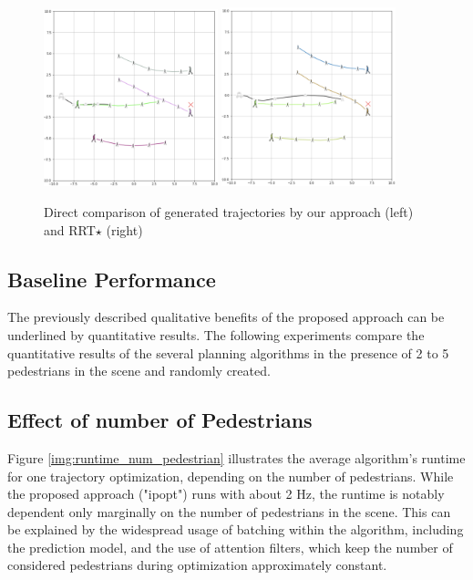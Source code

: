 {\begin{figure}[!ht]
\begin{center}
\includegraphics[width=0.45\textwidth]{images/show_case_ipopt.png}
\includegraphics[width=0.45\textwidth]{images/show_case_rrt.png}
\end{center}
\caption{Direct comparison of generated trajectories by our approach (left) and \ac{RRT}$\star$ \cite{Karaman2011} (right)}
\label{img:show_case}
\end{figure}

\subsection{Baseline Performance}
The previously described qualitative benefits of the proposed approach can be underlined by quantitative results. The following experiments compare the quantitative results of the several planning algorithms in the presence of 2 to 5 pedestrians in the scene and randomly created. 

\subsection{Effect of number of Pedestrians}
Figure \ref{img:runtime_num_pedestrian} illustrates the average algorithm's runtime for one trajectory optimization, depending on the number of pedestrians. While the proposed approach ("ipopt") runs with about 2 Hz, the runtime is notably dependent only marginally on the number of pedestrians in the scene. This can be explained by the widespread usage of batching within the algorithm, including the prediction model, and the use of attention filters, which keep the number of considered pedestrians during optimization approximately constant.

}
